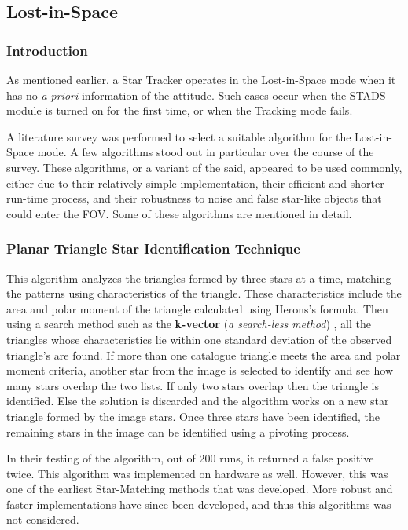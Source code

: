 \subsection{Lost-in-Space}
\subsubsection{Introduction}

As mentioned earlier, a Star Tracker operates in the Lost-in-Space mode when it has no \textit{a priori} information of the attitude. Such cases occur when the STADS module is turned on for the first time, or when the Tracking mode fails.

A literature survey was performed to select a suitable algorithm for the Lost-in-Space mode. A few algorithms stood out in particular over the course of the survey. These algorithms, or a variant of the said, appeared to be used commonly, either due to their relatively simple implementation, their efficient and shorter run-time process, and their robustness to noise and false star-like objects that could enter the FOV.
Some of these algorithms are mentioned in detail.

\subsubsection{Planar Triangle Star Identification Technique}

This algorithm \cite{mcbryde2012star} analyzes the triangles formed by three stars at a time, matching the patterns using characteristics of the triangle. These characteristics include the area and polar moment of the triangle calculated using Herons’s formula. 
Then using a search method such as the \textbf{k-vector} (\textit{a search-less method}) \cite{mortari2014k}, all the triangles whose characteristics lie within one standard deviation of the observed triangle's are found. 
If more than one catalogue triangle meets the area and polar moment criteria, another star from the image is selected to identify and see how many stars overlap the two lists. If only two stars overlap then the triangle is identified. Else the solution is discarded and the algorithm works on a new star triangle formed by the image stars. 
Once three stars have been identified, the remaining stars in the image can be identified using a pivoting process. 

In their testing of the algorithm, out of 200 runs, it returned a false positive twice. This algorithm was implemented on hardware as well. 
However, this was one of the earliest Star-Matching methods that was developed. More robust and faster implementations have since been developed, and thus this algorithms was not considered.


